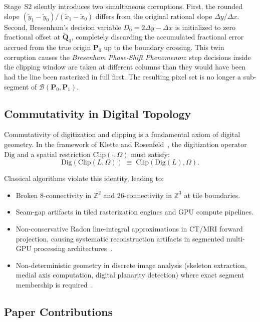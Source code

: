 \documentclass[12pt,a4paper]{article}
\theoremstyle{definition}
\newcommand{\Zt}{\mathbb{Z}^2}
\newcommand{\Zth}{\mathbb{Z}^3}
\newcommand{\Clip}{\mathrm{Clip}}
\newcommand{\Dig}{\mathrm{Dig}}
\newcommand{\Bresen}{\mathcal{B}}
\newcommand{\dx}{\Delta x}
\newcommand{\dy}{\Delta y}
\begin{document}
Stage~S2 silently introduces two simultaneous corruptions.
First, the rounded slope $(\tilde{y}_1 - \tilde{y}_0)/
(\tilde{x}_1 - \tilde{x}_0)$ differs from the original
rational slope $\dy/\dx$.  Second, Bresenham's decision
variable $D_0 = 2\dy - \dx$ is initialized to zero
fractional offset at $\tilde{\mathbf{Q}}_0$, completely
discarding the accumulated fractional error accrued from
the true origin $\mathbf{P}_0$ up to the boundary crossing.
This twin corruption causes the \emph{Bresenham Phase-Shift
Phenomenon}: step decisions inside the clipping window are
taken at different columns than they would have been had the
line been rasterized in full first. The resulting pixel set
is no longer a sub-segment of $\Bresen(\mathbf{P}_0,
\mathbf{P}_1)$.

\subsection{Commutativity in Digital Topology}
\label{sec:commutativity}

Commutativity of digitization and clipping is a fundamental
axiom of digital geometry. In the framework of Klette and
Rosenfeld~\cite{klette2004digital}, the digitization
operator $\Dig$ and a spatial restriction
$\Clip(\cdot,\Omega)$ must satisfy:
\begin{equation}
  \label{eq:commutativity}
  \Dig(\Clip(L, \Omega)) \;\equiv\; \Clip(\Dig(L), \Omega).
\end{equation}

Classical algorithms violate this identity, leading to:
\begin{itemize}
  \item Broken 8-connectivity in $\Zt$ and 26-connectivity
    in $\Zth$ at tile boundaries.
  \item Seam-gap artifacts in tiled rasterization engines
    and GPU compute pipelines.
  \item Non-conservative Radon line-integral approximations
    in CT/MRI forward projection, causing systematic
    reconstruction artifacts in segmented multi-GPU
    processing architectures~\cite{siddon1985fast,jacobs1998fast}.
  \item Non-deterministic geometry in discrete image analysis
    (skeleton extraction, medial axis computation, digital
    planarity detection) where exact segment membership is
    required~\cite{debled1995linear,lachaud2007tangent}.
\end{itemize}

\subsection{Paper Contributions}
\label{sec:contributions}
\end{document}
